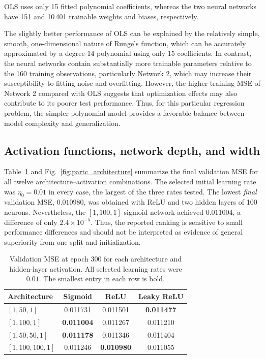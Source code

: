 \documentclass[aps,rmp,reprint,amsmath,amssymb,graphicx,longbibliography]{revtex4-1}
\begin{document}
OLS uses only 15 fitted polynomial coefficients, whereas the two neural
networks have 151 and 10\,401 trainable weights and biases, respectively.

The slightly better performance of OLS can be explained by the
relatively simple, smooth, one-dimensional nature of Runge's
function, which can be accurately approximated by a degree-14
polynomial using only 15 coefficients. In contrast, the neural
networks contain substantially more trainable parameters relative
to the 160 training observations, particularly Network 2, which
may increase their susceptibility to fitting noise and overfitting.
However, the higher training MSE of Network 2 compared with OLS
suggests that optimization effects may also contribute to its
poorer test performance. Thus, for this particular regression
problem, the simpler polynomial model provides a favorable
balance between model complexity and generalization.


\subsection{Activation functions, network depth, and width}
\label{subsec:partc_results}

Table~\ref{tab:partc_activation_mse} and
Fig.~\ref{fig:partc_architecture} summarize the final validation
MSE for all twelve architecture--activation combinations. The selected
initial learning rate was $\eta_0=0.01$ in every case, the largest of
the three rates tested. The lowest \emph{final} validation MSE,
$0.010980$, was obtained with ReLU and two hidden layers of 100 neurons.
Nevertheless, the $[1,100,1]$ sigmoid network achieved $0.011004$,
a difference of only $2.4\times10^{-5}$. Thus, the reported ranking
is sensitive to small performance differences and should not be
interpreted as evidence of general superiority from one split and
initialization.

\begin{table}[h]
 \centering
 \caption{Validation MSE at epoch 300 for each architecture and
 hidden-layer activation. All selected learning rates were $0.01$.
 The smallest entry in each row is bold.}
 \label{tab:partc_activation_mse}
 \begin{tabular}{lccc}
 \hline\hline
 Architecture & Sigmoid & ReLU & Leaky ReLU \\
 \hline
 $[1,50,1]$ & 0.011731 & 0.011501 & \textbf{0.011477} \\
 $[1,100,1]$ & \textbf{0.011004} & 0.011267 & 0.011210 \\
 $[1,50,50,1]$ & \textbf{0.011178} & 0.011346 & 0.011404 \\
 $[1,100,100,1]$ & 0.011246 & \textbf{0.010980} & 0.011055 \\
 \hline\hline
 \end{tabular}
\end{table}
\end{document}
